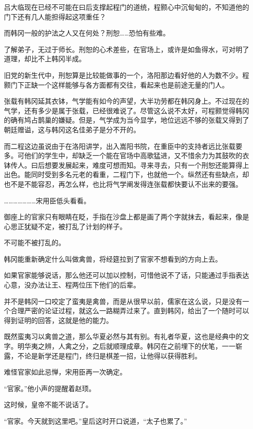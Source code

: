 吕大临现在已经不可能在曰后支撑起程门的道统，程颢心中沉甸甸的，不知道他的门下还有几人能担得起这项重任？

而韩冈一般的护法之人又在何处？刑恕……恐怕有些难。

了解弟子，无过于师长。刑恕的心术差些，在官场上，或许是如鱼得水，可对明了道理，却比不上韩冈半成。

旧党的新生代中，刑恕算是比较能做事的一个，洛阳那边看好他的人为数不少。程颢门下正缺一个这样能够与各方面都有交往，看起来也是前途无量的门人。

张载有韩冈延其衣钵，气学能有如今的声望，大半功劳都在韩冈身上。不过现在的气学，还有多少是属于张载，已经很难说了。尽管这么说不太好，可程颢觉得韩冈的确有鸠占鹊巢的嫌疑。但是，气学成为当今显学，地位远远不够的张载又得到了朝廷赠谥，这与韩冈这名佳弟子是分不开的。

而二程这边虽说由于在洛阳讲学，出入嵩阳书院，在重臣中的支持者远比张载要多。可他们的学生中，却缺乏一个能在官场中高歌猛进，又不惜余力为其鼓吹的衣钵传人。曰后想要发展起来，难度可想而知。寻来寻去，只有一个刑恕还能算得上出色。能同时受到多名元老的看重，二程门下，也就他一个。纵然还有些缺点，却也不是不能容忍，再怎么样，也比将气学阐发得连张载都快要认不出来的要强。

…………………宋用臣低头看看。

御座上的官家只有眼睛在眨，手指在沙盘上都是画了两个字就抹去，看起来，像是心思正犹疑不定，被打乱了计划的样子。

不可能不被打乱的。

韩冈能重新确定什么叫做禽兽，将经筵拉到了官家不想看到的方向上去。

如果官家能够说话，那么他还可以加以控制，可惜他说不了话，只能通过手指表达心意，没办法让王、程两位压下他们的后辈。

并不是韩冈一口咬定了蛮夷是禽兽，而是从很早以前，儒家在这么说，只是没有一个合理严密的论证过程，就这么一路糊弄过来了。直到韩冈，给出了一个随时可以得到证明的回答，这就是他的能力。

既然蛮夷习以禽兽之道，那么华夏必然与其有别。有礼者华夏，这也是经典中的文字。明华夷之辨，人禽之分，之后就顺理成章。韩冈在之前埋下的伏笔，一一崭露，不论是新学还是程门，终归是棋差一招，让他得以获得胜利。

难怪官家如此忌惮，宋用臣再一次确定。

“官家。”他小声的提醒着赵顼。

这时候，皇帝不能不说话了。

“官家。今天就到这里吧。”皇后这时开口说道，“太子也累了。”


